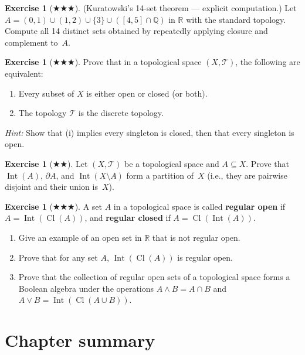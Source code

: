 \documentclass[11pt,a4paper,twoside]{book}
\theoremstyle{remark}
\theoremstyle{definition}
\newtheorem{exerciseplain}[theorem]{Exercise}
\theoremstyle{definition}
\newenvironment{exercise}[1][]{%
  \begin{exerciseplain}[#1]
}{%
  \end{exerciseplain}
}
\newcommand{\Tau}{\mathcal{T}}           %
\newcommand{\boundary}{\partial}         %
\newcommand{\R}{\mathbb{R}}
\newcommand{\Q}{\mathbb{Q}}
\DeclareMathOperator{\Int}{Int}
\DeclareMathOperator{\Cl}{Cl}
\begin{document}
\begin{exercise}[$\bigstar\!\bigstar\!\bigstar$]
\label{exer:ch2:7}
\textup{(Kuratowski's 14-set theorem --- explicit computation.)}
Let $A=(0,1)\cup(1,2)\cup\{3\}\cup([4,5]\cap\Q)$ in $\R$ with the standard
topology.  Compute all 14 distinct sets obtained by repeatedly applying
closure and complement to~$A$.
\end{exercise}

\begin{exercise}[$\bigstar\!\bigstar\!\bigstar$]
\label{exer:ch2:8}
Prove that in a topological space $(X,\Tau)$, the following are equivalent:
\begin{enumerate}[label=(\roman*)]
  \item Every subset of $X$ is either open or closed (or both).
  \item The topology $\Tau$ is the discrete topology.
\end{enumerate}
\emph{Hint:} Show that (i) implies every singleton is closed, then that every
singleton is open.
\end{exercise}

\begin{exercise}[$\bigstar\!\bigstar$]
\label{exer:ch2:9}
Let $(X,\Tau)$ be a topological space and $A\subseteq X$.  Prove that
$\Int(A)$, $\boundary A$, and $\Int(X\setminus A)$ form a partition of~$X$
(i.e., they are pairwise disjoint and their union is~$X$).
\end{exercise}

\begin{exercise}[$\bigstar\!\bigstar\!\bigstar$]
\label{exer:ch2:10}
A set $A$ in a topological space is called \textbf{regular open} if
$A=\Int(\Cl(A))$, and \textbf{regular closed} if $A=\Cl(\Int(A))$.
\begin{enumerate}[label=(\alph*)]
  \item Give an example of an open set in $\R$ that is not regular open.
  \item Prove that for any set $A$, $\Int(\Cl(A))$ is regular open.
  \item Prove that the collection of regular open sets of a topological space
        forms a Boolean algebra under the operations $A\wedge B=A\cap B$
        and $A\vee B=\Int(\Cl(A\cup B))$.
\end{enumerate}
\end{exercise}


\section*{Chapter summary}
\end{document}
